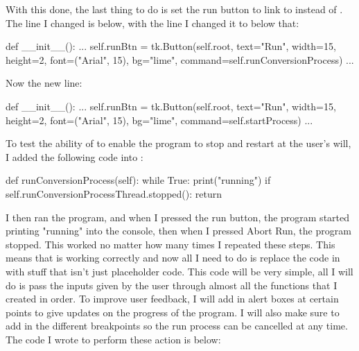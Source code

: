 \documentclass{report}
\begin{document}
With this done, the last thing to do is set the run button to link to  instead of . The line I changed is below, with the line I changed it to below that:
\begin{python}
def __init__():
    ...
    self.runBtn = tk.Button(self.root, text="Run", width=15, height=2,
        font=("Arial", 15), bg="lime", command=self.runConversionProcess)
    ...
\end{python}
Now the new line:
\begin{python}
def __init__():
    ...
    self.runBtn = tk.Button(self.root, text="Run", width=15, height=2,
        font=("Arial", 15), bg="lime", command=self.startProcess)
    ...
\end{python}
To test the ability of  to enable the program to stop and restart at the user's will, I added the following code into :
\begin{python}
def runConversionProcess(self):
    while True:
        print("running")
        if self.runConversionProcessThread.stopped():
            return
\end{python}
I then ran the program, and when I pressed the run button, the program started printing "running" into the console, then when I pressed Abort Run, the program stopped. This worked no matter how many times I repeated these steps. This means that  is working correctly and now all I need to do is replace the code in  with stuff that isn't just placeholder code.
\newline
\newline
This code will be very simple, all I will do is pass the inputs given by the user through almost all the functions that I created in order. To improve user feedback, I will add in alert boxes at certain points to give updates on the progress of the program. I will also make sure to add in the different breakpoints so the run process can be cancelled at any time. The code I wrote to perform these action is below:
\end{document}
